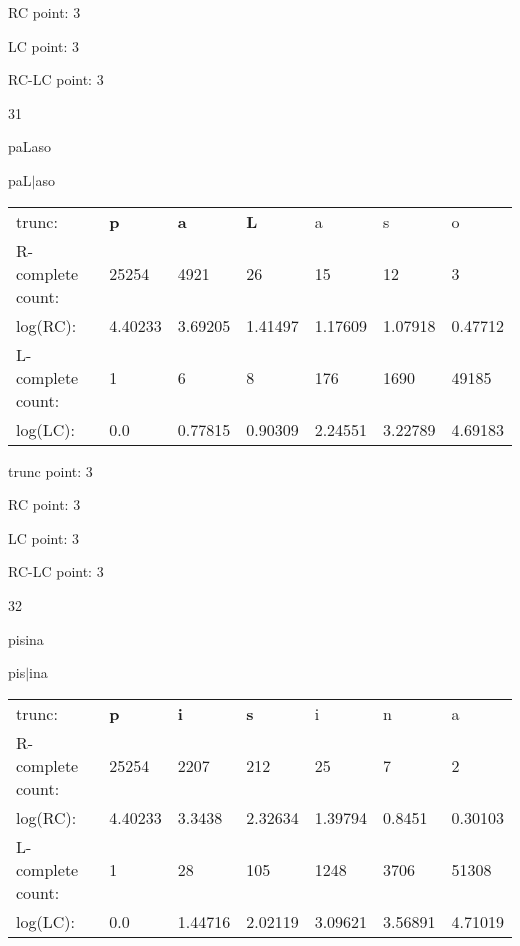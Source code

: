 \documentclass{article}
\begin{document}
RC point: 3

LC point: 3

RC-LC point: 3

\vspace{3em}



31

paLaso

paL$|$aso

\vspace{1em}

\begin{tabular}{l|llllll}

trunc: & {\color{red}\bf p} & {\color{red}\bf a} & {\color{red}\bf L} & a & s & o \\ 
R-complete count: & 25254 & 4921 & 26 & 15 & 12 & 3 \\ 
log(RC): & 4.40233 & 3.69205 & 1.41497 & 1.17609 & 1.07918 & 0.47712 \\ 
L-complete count: & 1 & 6 & 8 & 176 & 1690 & 49185 \\ 
log(LC): & 0.0 & 0.77815 & 0.90309 & 2.24551 & 3.22789 & 4.69183 \\ 
\end{tabular}

trunc point: 3

RC point: 3

LC point: 3

RC-LC point: 3

\vspace{3em}



32

pisina

pis$|$ina

\vspace{1em}

\begin{tabular}{l|llllll}

trunc: & {\color{red}\bf p} & {\color{red}\bf i} & {\color{red}\bf s} & i & n & a \\ 
R-complete count: & 25254 & 2207 & 212 & 25 & 7 & 2 \\ 
log(RC): & 4.40233 & 3.3438 & 2.32634 & 1.39794 & 0.8451 & 0.30103 \\ 
L-complete count: & 1 & 28 & 105 & 1248 & 3706 & 51308 \\ 
log(LC): & 0.0 & 1.44716 & 2.02119 & 3.09621 & 3.56891 & 4.71019 \\ 
\end{tabular}
\end{document}
